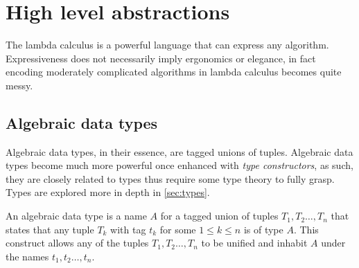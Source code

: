 \section{High level abstractions}\label{sec:highlevel}
The lambda calculus is a powerful language that can express any algorithm.
Expressiveness does not necessarily imply ergonomics or elegance, in fact encoding moderately complicated algorithms in lambda calculus becomes quite messy.

\subsection{Algebraic data types}
\label{sec:adt}
Algebraic data types, in their essence, are tagged unions of tuples.
Algebraic data types become much more powerful once enhanced with \textit{type constructors}, as such, they are closely related to types thus require some type theory to fully grasp.
Types are explored more in depth in \autoref{sec:types}.

An algebraic data type is a name $A$ for a tagged union of tuples $T_1, T_2 \dots , T_n$ that states that any tuple $T_k$ with tag $t_k$ for some $1 \leq k \leq n$ is of type $A$.
This construct allows any of the tuples $T_1, T_2 \dots , T_n$ to be unified and inhabit $A$ under the names $t_1, t_2 \dots , t_n$.

